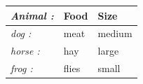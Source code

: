 \documentclass{article}
\begin{document}
\begin{tabular}{>{\itshape}l<{:} *{2}{l}}
\toprule
Animal & Food & Size \\
\midrule
dog & meat & medium \\
horse & hay & large \\
frog & flies & small \\
\bottomrule
\end{tabular}
\end{document}
